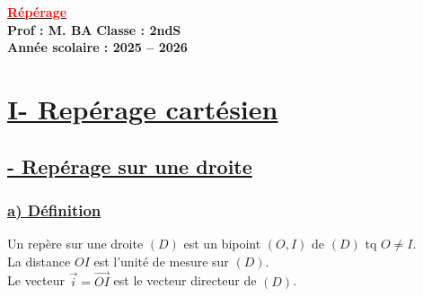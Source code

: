 \documentclass[12pt,a4paper]{article}
\begin{document}
\begin{center}
    \Large\textbf{\underline{\textcolor{red}{Répérage}}}\\[-0.1cm]
    \normalsize\textbf{Prof : M. BA} \hfill \textbf{Classe : 2ndS}\\[-0.1cm]
    \textbf{Année scolaire : 2025 -- 2026}
\end{center}

\begin{center}
\end{center}

\vspace{0.5cm}

\section*{\centering \underline{\color{red}I- Repérage cartésien}}
\subsection*{\centering \underline{\color{red}- Repérage sur une droite}}

\subsubsection*{\centering \underline{\color{red}a) Définition}}

Un repère sur une droite $(D)$ est un bipoint $(O, I)$ de $(D)$ tq $O \neq I$. \\
La distance $OI$ est l'unité de mesure sur $(D)$. \\
Le vecteur $\vec{i} = \overrightarrow{OI}$ est le vecteur directeur de $(D)$.

\vspace{0.5cm}

\begin{center}
\end{center}
\end{document}
